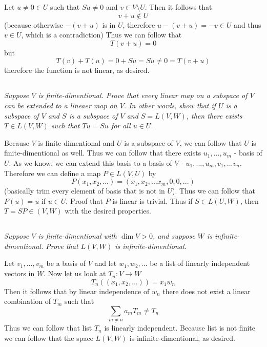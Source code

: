 \documentclass[11pt,oneside,titlepage]{book}
\begin{document}
Let $u \neq 0 \in U$ such that $Su \neq 0$ and $v \in V \setminus U$. Then it follows that
$$v + u \notin U$$
(because otherwise $-(v + u)$ is in $U$, therefore $u - (v + u) = -v \in U$ and
thus $v \in U$, which is a contradiction)
Thus we can follow that
$$T(v + u) = 0$$
but
$$T(v) + T(u) = 0 + Su = Su \neq 0 = T(v + u)$$
therefore the function is not linear, as desired.

\subsection{}
\textit{Suppose $V$ is finite-dimentional. Prove that every linear map on a subspace of $V$
  can be extended to a lineaer map on $V$. In other words, show that if $U$ is a subspace of $V$
  and $S$ is a subspace of $V$ and $S = L(V, W)$, then there exists $T \in L(V, W)$ such that
  $Tu = Su$ for all $u \in U$.}

Because $V$ is finite-dimentional and $U$ is a subspace of $V$, we can follow that $U$
is finite-dimentional as well. Thus we can follow that there exists
$u_1, ..., u_m$ - basis of $U$. As we know, we can extend this basis to a basis of $V$ -
$u_1, ..., u_m, v_1, ... v_n$. Therefore we can define a map $P \in L(V, U)$ by 
$$P(x_1, x_2, ...) = (x_1, x_2, ... x_m, 0, 0, ...)$$
(basically trim every element of basis that is not in $U$). Thus we can follow that
$P(u) = u$ if $u \in U$. Proof that $P$ is linear is trivial.
Thus if $S \in L(U, W)$, then $T = SP \in (V, W)$ with the
desired properties.

\subsection{}

\textit{Suppose $V$ is finite-dimentional with $\dim V > 0$, and suppose $W$ is
  infinite-dimentional. Prove that $L(V, W)$ is infinite-dimentional.}

Let $v_1, ..., v_m$ be a basis of $V$ and
let $w_1, w_2, ...$ be a list of linearly independent vectors in $W$. Now
let us look at $T_n: V \to W$
$$T_n((x_1, x_2, ...) ) = x_1 w_n$$
Then it follows that by linear independence of $w_n$ there does not exist a linear
combination of $T_m$ such that
$$\sum_{m \neq n} a_m T_m \neq T_n$$
Thus we can follow that list $T_n$ is linearly independent.
Because list is not finite we can follow that the space $L(V, W)$ is infinite-dimentional,
as desired.

\subsection{}
\end{document}
